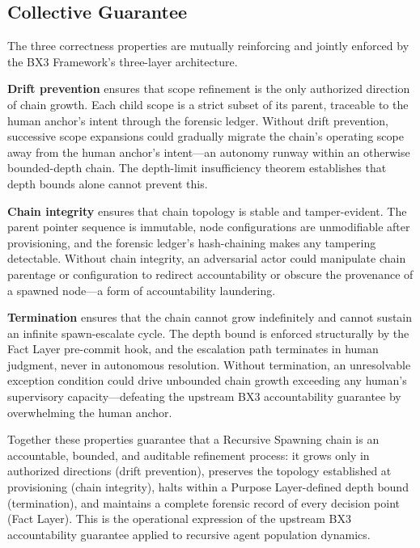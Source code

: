 \subsection{Collective Guarantee}
\label{sec:rs-collective-guarantee}

The three correctness properties are mutually reinforcing and jointly enforced by the BX3 Framework's three-layer architecture.

\medskip
\textbf{Drift prevention} ensures that scope refinement is the only authorized direction of chain growth. Each child scope is a strict subset of its parent, traceable to the human anchor's intent through the forensic ledger. Without drift prevention, successive scope expansions could gradually migrate the chain's operating scope away from the human anchor's intent---an autonomy runway within an otherwise bounded-depth chain. The depth-limit insufficiency theorem establishes that depth bounds alone cannot prevent this.

\medskip
\textbf{Chain integrity} ensures that chain topology is stable and tamper-evident. The parent pointer sequence is immutable, node configurations are unmodifiable after provisioning, and the forensic ledger's hash-chaining makes any tampering detectable. Without chain integrity, an adversarial actor could manipulate chain parentage or configuration to redirect accountability or obscure the provenance of a spawned node---a form of accountability laundering.

\medskip
\textbf{Termination} ensures that the chain cannot grow indefinitely and cannot sustain an infinite spawn-escalate cycle. The depth bound is enforced structurally by the Fact Layer pre-commit hook, and the escalation path terminates in human judgment, never in autonomous resolution. Without termination, an unresolvable exception condition could drive unbounded chain growth exceeding any human's supervisory capacity---defeating the upstream BX3 accountability guarantee by overwhelming the human anchor.

Together these properties guarantee that a Recursive Spawning chain is an accountable, bounded, and auditable refinement process: it grows only in authorized directions (drift prevention), preserves the topology established at provisioning (chain integrity), halts within a Purpose Layer-defined depth bound (termination), and maintains a complete forensic record of every decision point (Fact Layer). This is the operational expression of the upstream BX3 accountability guarantee applied to recursive agent population dynamics.